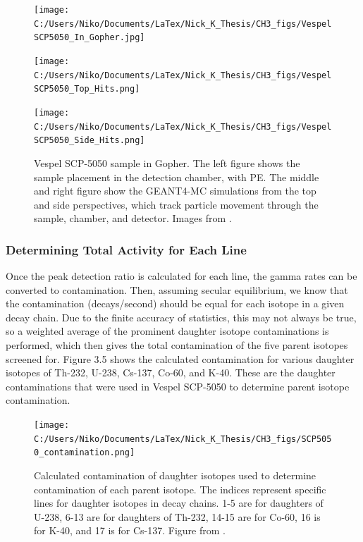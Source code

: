 \documentclass{report}
\begin{document}
\begin{figure}[h]
\centering
\begin{minipage}{.34\textwidth}
\texttt{[image: C:/Users/Niko/Documents/LaTex/Nick\_K\_Thesis/CH3\_figs/VespelSCP5050\_In\_Gopher.jpg]}
\end{minipage}
\begin{minipage}{.3\textwidth}
\texttt{[image: C:/Users/Niko/Documents/LaTex/Nick\_K\_Thesis/CH3\_figs/VespelSCP5050\_Top\_Hits.png]}
\end{minipage}
\begin{minipage}{.3\textwidth}
\texttt{[image: C:/Users/Niko/Documents/LaTex/Nick\_K\_Thesis/CH3\_figs/VespelSCP5050\_Side\_Hits.png]}
\end{minipage}
\caption{Vespel SCP-5050 sample in Gopher. The left figure shows the sample placement in the detection chamber, with PE. The middle and right figure show the GEANT4-MC simulations from the top and side perspectives, which track particle movement through the sample, chamber, and detector. Images from \cite{GopherSCP5050}.}
\end{figure}

\subsubsection{Determining Total Activity for Each Line}

Once the peak detection ratio is calculated for each line, the gamma rates can be converted to contamination. Then, assuming secular equilibrium, we know that the contamination (decays/second) should be equal for each isotope in a given decay chain. Due to the finite accuracy of statistics, this may not always be true, so a weighted average of the prominent daughter isotope contaminations is performed, which then gives the total contamination of the five parent isotopes screened for. Figure 3.5 shows the calculated contamination for various daughter isotopes of Th-232, U-238, Cs-137, Co-60, and K-40. These are the daughter contaminations that were used in Vespel SCP-5050 to determine parent isotope contamination.

\begin{figure}
\centering
\texttt{[image: C:/Users/Niko/Documents/LaTex/Nick\_K\_Thesis/CH3\_figs/SCP5050\_contamination.png]}
\caption{Calculated contamination of daughter isotopes used to determine contamination of each parent isotope. The indices represent specific lines for daughter isotopes in decay chains. 1-5 are for daughters of U-238, 6-13 are for daughters of Th-232, 14-15 are for Co-60, 16 is for K-40, and 17 is for Cs-137. Figure from \cite{GopherSCP5050}. }
\end{figure}
\end{document}
